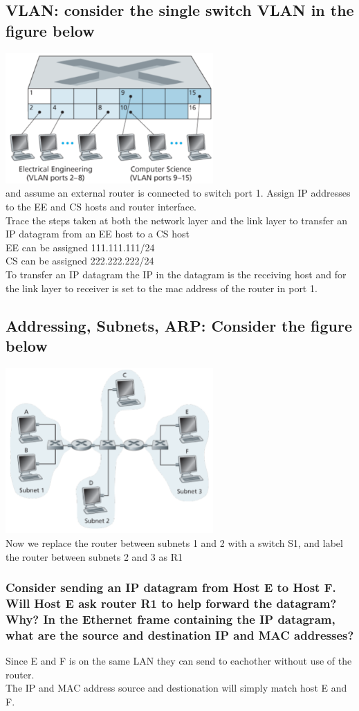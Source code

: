 \documentclass[12pt, a4paper]{article}
\begin{document}
		\subsection{VLAN: consider the single switch VLAN in the figure below}
			\includegraphics[width=300px]{assets/11.2.png}\\
			and assume an external router is connected to switch port 1. Assign IP addresses to the EE and CS hosts and router interface.\\
			Trace the steps taken at both the network layer and the link layer to transfer an IP datagram from an EE host to a CS host\\
			EE can be assigned 111.111.111/24\\
			CS can be assigned 222.222.222/24\\
			To transfer an IP datagram the IP in the datagram is the receiving host and for the link layer to receiver is set to the mac address of the router in port 1.
		\subsection{Addressing, Subnets, ARP: Consider the figure below}
			\includegraphics[width=300px]{assets/11.3.png}\\
			Now we replace the router between subnets 1 and 2 with a switch S1, and label the router between subnets 2 and 3 as R1
			\subsubsection{Consider sending an IP datagram from Host E to Host F. Will Host E ask router R1 to help forward the datagram? Why? In the Ethernet frame containing the IP datagram, what are the source and destination IP and MAC addresses?}
				Since E and F is on the same LAN they can send to eachother without use of the router.\\
				The IP and MAC address source and destionation will simply match host E and F.
\end{document}
